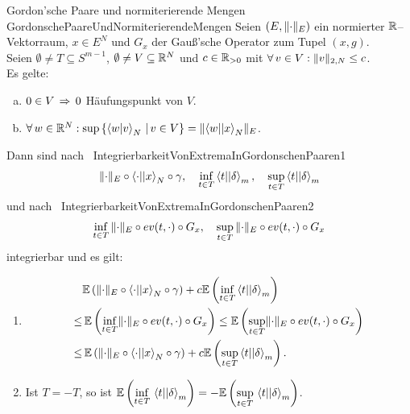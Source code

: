 \begin{korollar}{Gordon'sche Paare und normiterierende Mengen}
{GordonschePaareUndNormiterierendeMengen}
Seien $(E, \lVert\cdot\rVert_E)$ ein normierter $\mathbb{R}$--Vektorraum, $x\in E^N$ und
$G_x$ der Gauß'sche Operator zum Tupel $(x,g)$.\\
Seien $\emptyset \neq T \subseteq S^{m-1}$,
$\emptyset\neq V\subseteq \mathbb{R}^N$ und $c \in \mathbb{R}_{> 0}$ mit
$\forall\, v \in V: \lVert v\rVert_{2, N} \le c$.\\
Es gelte:
\begin{enumerate}[(a)]
	\item $0 \in V \, \Rightarrow \, 0$ Häufungspunkt von $V$.
	\item $\forall\, w \in \mathbb{R}^N: \sup\left\{\left\langle w |v\right\rangle _N\,|\,v \in V\right\} 
	= \lVert\left\langle w ||x\right\rangle_N\rVert_E$.
\end{enumerate}
Dann sind nach~
{IntegrierbarkeitVonExtremaInGordonschenPaaren1}
\[\lVert\cdot\rVert_E \circ \left\langle \cdot ||x\right\rangle _N \circ \gamma, \quad
\inf_{t\in T}\left\langle t ||\delta\right\rangle_m, \quad \sup_{t\in T}\left\langle t ||\delta\right\rangle_m\]
und nach~
{IntegrierbarkeitVonExtremaInGordonschenPaaren2}
\[\inf_{t \in T}\, \lVert\cdot\rVert_E \circ ev(t,\cdot)\circ G_x, \quad
\sup_{t \in T}\, \lVert\cdot\rVert_E \circ ev(t,\cdot)\circ G_x \]
integrierbar und es gilt:
\begin{enumerate}[(1)]
	\item \label{GordonschePaareUndNormiterierendeMengen1}
	\begin{align*}
	& \mathbb{E}\left( \lVert\cdot\rVert_E \circ \left\langle \cdot ||x\right\rangle _N \circ \gamma\right)
	+ c \mathbb{E}\left(\inf_{t\in T}\left\langle t ||\delta\right\rangle_m \right)\\
	\le &\,\mathbb{E}\left(\inf_{t \in T} \lVert\cdot\rVert_E \circ ev(t,\cdot)\circ G_x \right)
	\le \mathbb{E}\left(\sup_{t \in T} \lVert\cdot\rVert_E \circ ev(t,\cdot)\circ G_x \right)\\
	\le &\,\mathbb{E}\left( \lVert\cdot\rVert_E \circ \left\langle \cdot ||x\right\rangle _N \circ \gamma\right)
	+ c \mathbb{E}\left(\sup_{t\in T}\left\langle t ||\delta\right\rangle_m \right)\text.
	\end{align*}
	\item \label{GordonschePaareUndNormiterierendeMengen2}
	Ist $T = -T$, so ist
	$\mathbb{E}\left(\underset{t\in T}\inf\,\left\langle t ||\delta\right\rangle_m \right)
	= - \mathbb{E}\left(\underset{t\in T}\sup\,\left\langle t ||\delta\right\rangle_m \right)$.
\end{enumerate}
\end{korollar}
